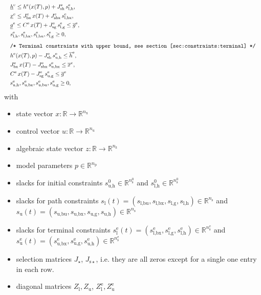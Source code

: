 \documentclass[english]{article}
\newcommand{\ind}[1]{_{\textrm{#1}}}
\newcommand{\terminal}{^{\textrm{e}}}
\newcommand{\initial}{^{\textrm{0}}}
\newcommand{\Lower}{\ind{l}}
\newcommand{\lowerh}{\ind{l,h}}
\newcommand{\lowerbx}{\ind{l,bx}}
\newcommand{\lowerbu}{\ind{l,bu}}
\newcommand{\lowerg}{\ind{l,g}}
\newcommand{\upper}{\ind{u}}
\newcommand{\upperh}{\ind{u,h}}
\newcommand{\upperbx}{\ind{u,bx}}
\newcommand{\upperbu}{\ind{u,bu}}
\newcommand{\upperg}{\ind{u,g}}
\newcommand{\mathComment}[1]{\texttt{/* #1 */}}
\newcommand{\R}{\mathbb{R}}
\newcommand{\nx}{n\ind{x}}
\newcommand{\nuu}{n\ind{u}}
\newcommand{\nz}{n\ind{z}}
\newcommand{\np}{n\ind{p}}
\newcommand{\ns}{n\ind{s}}
\begin{document}
\begin{align}
    &&&\underline{h}\terminal \leq h\terminal(x(T), p) + J\ind{sh}\terminal\, s\lowerh\terminal, &&\label{eq:constraints:terminal:lower_bounds:start}\\
    &&&\underline{x}\terminal \leq J_{\textrm{bx}}\terminal\, x(T) + J\ind{sbx}\terminal\, s\lowerbx\terminal, &&\\ %
    &&&\underline{g}\terminal \leq C\terminal\, x(T) + J\ind{sg}\terminal\, s\lowerg\terminal \leq \overline{g}\terminal, && \\
    &&& s\lowerh\terminal, s\lowerbx\terminal, s\lowerbu\terminal, s\lowerg\terminal \geq 0, \label{eq:constraints:terminal:lower_bounds:end}\\[1ex]
    &&&\mathComment{Terminal constraints with upper bound, see section \ref{sec:constraints:terminal}}\nonumber\\
    &&& h\terminal(x(T), p) - J\ind{sh}\terminal\, s\ind{u,h}\terminal \leq \overline{h}\terminal, &&\label{eq:constraints:terminal:upper_bounds:start}\\
    &&& J_{\textrm{bx}}\terminal\, x(T) - J\ind{sbx}\terminal\, s\ind{u,bx}\terminal \leq \overline{x}^{e}, &&\\
    &&& C\terminal\, x(T) - J\ind{sg}\terminal\, s\ind{u,g}\terminal \leq \overline{g}\terminal \\
    &&& s\upperh\terminal, s\upperbx\terminal, s\upperbu\terminal, s\upperg\terminal \geq 0,\label{eq:constraints:terminal:upper_bounds:end}
\end{align}
%
with
\begin{itemize}
\item state vector $ x: \R \rightarrow \R^{\nx} $
\item control vector $ u: \R \rightarrow \R^{\nuu} $
\item algebraic state vector $ z: \R \rightarrow \R^{\nz} $
\item model parameters $ p \in \R^{\np} $
\item slacks for initial constraints $s\ind{u,h}\initial \in \R^{\ns\initial}$ and $s\ind{l,h}\initial \in \R^{\ns\initial}$
\item slacks for path constraints $ s\Lower(t) = (s\lowerbu, s\lowerbx, s\lowerg, s\lowerh) \in \R^{\ns} $ and $ s\upper(t) = (s\upperbu, s\upperbx, s\upperg, s\upperh) \in \R^{\ns} $
\item slacks for terminal constraints $ s\Lower\terminal(t) = (s\lowerbx\terminal, s\lowerg\terminal, s\lowerh\terminal) \in \R^{\ns\terminal} $ and $ s\upper\terminal(t) = (s\upperbx\terminal, s\upperg\terminal, s\upperh\terminal) \in \R^{\ns\terminal} $
\item selection matrices $J_{\star}$, $J_{\mathrm{s}\star}$, i.e. they are all zeros except for a single one entry in each row.
\item diagonal matrices $Z\ind{l}, Z\ind{u}$, $Z\ind{l}\terminal, Z\ind{u}\terminal$
\end{itemize}
\end{document}
